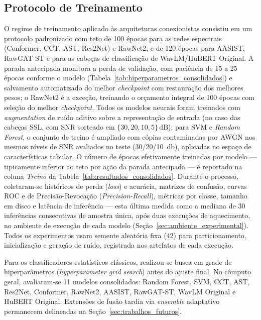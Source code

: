 \documentclass[12pt,a4paper]{article}
\begin{document}
\subsection{Protocolo de Treinamento}
\label{sec:protocolo_treinamento}

O regime de treinamento aplicado às arquiteturas conexionistas consistiu em um
protocolo padronizado com teto de \num{100} épocas para as redes espectrais
(Conformer, CCT, AST, Res2Net) e RawNet2, e de \num{120} épocas para AASIST,
RawGAT-ST e para as cabeças de classificação de WavLM/HuBERT Original. A
parada antecipada monitora a perda de validação, com paciência de \num{15} a
\num{25} épocas conforme o modelo
(Tabela~\ref{tab:hiperparametros_consolidados}) e salvamento automatizado do
melhor \textit{checkpoint} com restauração dos melhores pesos; o RawNet2 é a
exceção, treinando o orçamento integral de \num{100} épocas com seleção do
melhor \textit{checkpoint}. Todos os modelos neurais foram treinados com
\textit{augmentation} de ruído aditivo sobre a representação de entrada (no
caso das cabeças SSL, com SNR sorteado em $\{30, 20, 10, 5\}$\,dB); para SVM e
\textit{Random Forest}, o conjunto de treino é ampliado com cópias
contaminadas por AWGN nos mesmos níveis de SNR avaliados no teste
(\num{30}/\num{20}/\SI{10}{\decibel}), aplicadas no espaço de características
tabular. O número de épocas efetivamente treinadas por modelo ---
tipicamente inferior ao teto por ação da parada antecipada --- é reportado na
coluna \textit{Treino} da Tabela~\ref{tab:resultados_consolidados}. Durante o
processo, coletaram-se históricos de perda (\textit{loss}) e acurácia,
matrizes de confusão, curvas ROC e de Precisão-Revocação
(\textit{Precision-Recall}), métricas por classe, tamanho em disco e latência
de inferência --- esta última medida como a mediana de \num{30} inferências
consecutivas de amostra única, após duas execuções de aquecimento, no ambiente
de execução de cada modelo (Seção~\ref{sec:ambiente_experimental}). Todos os
experimentos usam semente aleatória fixa ($42$) para particionamento,
inicialização e geração de ruído, registrada nos artefatos de cada execução.

Para os classificadores estatísticos clássicos, realizou-se busca em grade de
hiperparâmetros (\textit{hyperparameter grid search}) antes do ajuste final. No
cômputo geral, avaliaram-se \num{11} modelos consolidados: Random Forest, SVM,
CCT, AST, Res2Net, Conformer, RawNet2, AASIST, RawGAT-ST, WavLM Original e
HuBERT Original. Extensões de fusão tardia via \textit{ensemble} adaptativo
permanecem delineadas na Seção~\ref{sec:trabalhos_futuros}.
\end{document}
